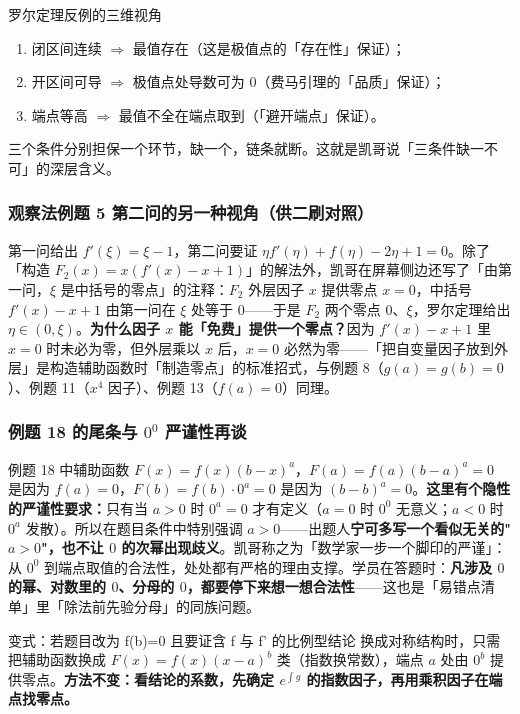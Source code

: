 \documentclass[a4paper]{article}
\begin{document}
\begin{importantbox}{罗尔定理反例的三维视角}
\begin{enumerate}
\item 闭区间连续 $\Rightarrow$ 最值存在（这是极值点的「存在性」保证）；
\item 开区间可导 $\Rightarrow$ 极值点处导数可为 0（费马引理的「品质」保证）；
\item 端点等高 $\Rightarrow$ 最值不全在端点取到（「避开端点」保证）。
\end{enumerate}
三个条件分别担保一个环节，缺一个，链条就断。这就是凯哥说「三条件缺一不可」的深层含义。
\end{importantbox}

\subsubsection{观察法例题 5 第二问的另一种视角（供二刷对照）}

第一问给出 $f'(\xi)=\xi-1$，第二问要证 $\eta f'(\eta)+f(\eta)-2\eta+1=0$。除了「构造 $F_2(x)=x(f'(x)-x+1)$」的解法外，凯哥在屏幕侧边还写了「由第一问，$\xi$ 是中括号的零点」的注释：$F_2$ 外层因子 $x$ 提供零点 $x=0$，中括号 $f'(x)-x+1$ 由第一问在 $\xi$ 处等于 0——于是 $F_2$ 两个零点 $0$、$\xi$，罗尔定理给出 $\eta\in(0,\xi)$。\textbf{为什么因子 $x$ 能「免费」提供一个零点？}因为 $f'(x)-x+1$ 里 $x=0$ 时未必为零，但外层乘以 $x$ 后，$x=0$ 必然为零——「把自变量因子放到外层」是构造辅助函数时「制造零点」的标准招式，与例题 8（$g(a)=g(b)=0$）、例题 11（$x^4$ 因子）、例题 13（$f(a)=0$）同理。

\subsubsection{例题 18 的尾条与 $0^0$ 严谨性再谈}

例题 18 中辅助函数 $F(x)=f(x)(b-x)^a$，$F(a)=f(a)(b-a)^a=0$ 是因为 $f(a)=0$，$F(b)=f(b)\cdot0^{a}=0$ 是因为 $(b-b)^a=0$。\textbf{这里有个隐性的严谨性要求：}只有当 $a>0$ 时 $0^a=0$ 才有定义（$a=0$ 时 $0^0$ 无意义；$a<0$ 时 $0^a$ 发散）。所以在题目条件中特别强调 $a>0$——出题人\textbf{宁可多写一个看似无关的"$a>0$"，也不让 $0$ 的次幂出现歧义}。凯哥称之为「数学家一步一个脚印的严谨」：从 $0^0$ 到端点取值的合法性，处处都有严格的理由支撑。学员在答题时：\textbf{凡涉及 $0$ 的幂、对数里的 $0$、分母的 $0$，都要停下来想一想合法性}——这也是「易错点清单」里「除法前先验分母」的同族问题。

\begin{knowledgebox}{变式：若题目改为 f(b)=0 且要证含 f 与 f' 的比例型结论}
换成对称结构时，只需把辅助函数换成 $F(x)=f(x)(x-a)^{b}$ 类（指数换常数），端点 $a$ 处由 $0^{b}$ 提供零点。\textbf{方法不变：看结论的系数，先确定 $e^{\int g}$ 的指数因子，再用乘积因子在端点找零点。}
\end{knowledgebox}
\end{document}
